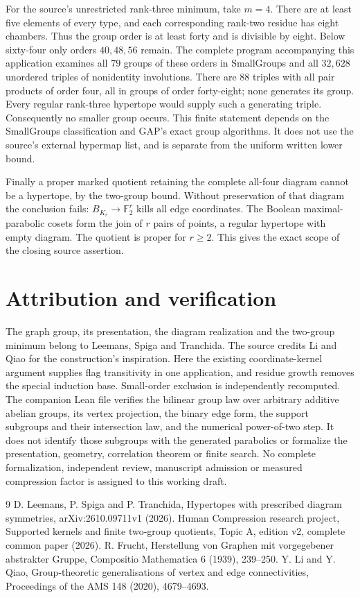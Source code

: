 \documentclass[11pt,a4paper]{article}
\newcommand{\F}{\mathbb F_2}
\begin{document}
For the source's unrestricted rank-three minimum, take $m=4$. There are
at least five elements of every type, and each corresponding rank-two
residue has eight chambers. Thus the group order is at least forty and
is divisible by eight. Below sixty-four only orders $40,48,56$ remain.
The complete program accompanying this application examines all $79$ groups
of these orders in SmallGroups and all $32,628$ unordered triples of
nonidentity involutions. There are $88$ triples with all pair products of
order four, all in groups of order forty-eight; none generates its group.
Every regular rank-three hypertope would supply such a generating triple.
Consequently no smaller group occurs. This finite statement depends on
the SmallGroups classification and GAP's exact group algorithms. It does
not use the source's external hypermap list, and is separate from the
uniform written lower bound.

Finally a proper marked quotient retaining the complete all-four diagram
cannot be a hypertope, by the two-group bound. Without preservation of that
diagram the conclusion fails: $B_{K_r}\to\F^r$ kills all edge coordinates.
The Boolean maximal-parabolic cosets form the join of $r$ pairs of points,
a regular hypertope with empty diagram. The quotient is proper for $r\geq2$.
This gives the exact scope of the closing source assertion.
\section*{Attribution and verification}
The graph group, its presentation, the diagram realization and the two-group
minimum belong to Leemans, Spiga and Tranchida. The source credits Li and
Qiao for the construction's inspiration. Here the existing coordinate-kernel
argument supplies flag transitivity in one application, and residue growth
removes the special induction base. Small-order exclusion is independently
recomputed. The companion Lean file verifies the bilinear group law over
arbitrary additive abelian groups, its vertex projection, the binary edge
form, the support subgroups and their intersection law, and the numerical
power-of-two step. It does not identify those subgroups with the generated
parabolics or formalize the presentation, geometry, correlation theorem or
finite search. No complete formalization, independent review, manuscript
admission or measured compression factor is assigned to this working draft.
\begin{thebibliography}{9}
 D. Leemans, P. Spiga and P. Tranchida, Hypertopes with prescribed
diagram symmetries, arXiv:2610.09711v1 (2026).
 Human Compression research project, Supported kernels and finite
two-group quotients, Topic A, edition v2, complete common paper (2026).
 R. Frucht, Herstellung von Graphen mit vorgegebener abstrakter
Gruppe, Compositio Mathematica 6 (1939), 239--250.
 Y. Li and Y. Qiao, Group-theoretic generalisations of vertex and
edge connectivities, Proceedings of the AMS 148 (2020), 4679--4693.
\end{thebibliography}
\end{document}
